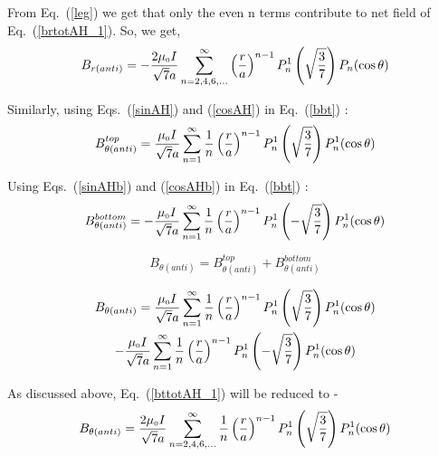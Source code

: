 From Eq.~(\ref{leg}) we get that only the even n terms contribute to net field of Eq.~(\ref{brtotAH_1}). So, we get,
\begin{equation}\label{brtotAH}
B_{r(anti)}=-\frac{2 \mu_{\scriptscriptstyle 0} I }{\sqrt{7}a}\sum_{n=2,4,6,...}^{\infty}
\left(\frac{r}{a}\right)^{n-1}P_n^1\left(\sqrt{\frac{3}{7}}\right) P_n(\cos\theta)
\end{equation}


Similarly, using Eqs.~(\ref{sinAH}) and (\ref{cosAH}) in Eq.~(\ref{bbt}) :
\begin{equation}\label{bbtAH}
B_{\theta(anti)}^{top}=\frac{\mu_{\scriptscriptstyle 0} I }{\sqrt{7}a}\sum_{n=1}^{\infty} \frac{1}{n}\left(\frac{r}{a}\right)^{n-1}P_n^1\left(\sqrt{\frac{3}{7}}\right) P_n^1(\cos\theta)
\end{equation}

Using Eqs.~(\ref{sinAHb}) and (\ref{cosAHb}) in Eq.~(\ref{bbt}) :
\begin{equation}\label{bbtAHb}
B_{\theta(anti)}^{bottom}=-\frac{\mu_{\scriptscriptstyle 0} I }{\sqrt{7}a}\sum_{n=1}^{\infty}\frac{1}{n} \left(\frac{r}{a}\right)^{n-1}P_n^1\left(-\sqrt{\frac{3}{7}}\right) P_n^1(\cos\theta)
\end{equation}


$$B_{\theta(anti)}=B_{\theta(anti)}^{top}+B_{\theta(anti)}^{bottom}$$

\begin{multline}\label{bttotAH_1}
    B_{\theta(anti)}=\frac{\mu_{\scriptscriptstyle 0} I }{\sqrt{7}a}\sum_{n=1}^{\infty} \frac{1}{n}\left(\frac{r}{a}\right)^{n-1}P_n^1\left(\sqrt{\frac{3}{7}}\right) P_n^1(\cos\theta) \\-\frac{\mu_{\scriptscriptstyle 0} I }{\sqrt{7}a}\sum_{n=1}^{\infty}\frac{1}{n} \left(\frac{r}{a}\right)^{n-1}P_n^1\left(-\sqrt{\frac{3}{7}}\right) P_n^1(\cos\theta)
\end{multline}


As discussed above, Eq.~(\ref{bttotAH_1}) will be reduced to -
\begin{equation}\label{bttotAH}
B_{\theta(anti)}=\frac{2 \mu_{\scriptscriptstyle 0} I }{\sqrt{7}a}\sum_{n=2,4,6,...}^{\infty}
\frac{1}{n}\left(\frac{r}{a}\right)^{n-1}P_n^1\left(\sqrt{\frac{3}{7}}\right) P_n^1(\cos\theta)
\end{equation}